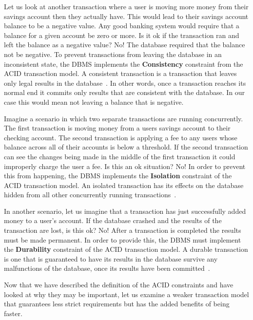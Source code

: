 \documentclass[12pt]{ucthesis}
\begin{document}
Let us look at another transaction where a user is moving more money from their savings account then they actually have. This would lead to their savings account balance to be a negative value. Any good banking system would require that a balance for a given account be zero or more. Is it ok if the transaction ran and left the balance as a negative value? No! The database required that the balance not be negative. To prevent transactions from leaving the database in an inconsistent state, the DBMS implements the \textbf{Consistency} constraint from the ACID transaction model. A consistent transaction is a transaction that leaves only legal results in the database~\cite{acid_def}. In other words, once a transaction reaches its normal end  it commits only results that are consistent with the database. In our case this would mean not leaving a balance that is negative.

Imagine a scenario in which two separate transactions are running concurrently. The first transaction is moving money from a users savings account to their checking account. The second transaction is applying a fee to any users whose balance across all of their accounts is below a threshold. If the second transaction can see the changes being made in the middle of the first transaction it could improperly charge the user a fee. Is this an ok situation? No! In order to prevent this from happening, the DBMS implements the \textbf{Isolation} constraint of the ACID transaction model. An isolated transaction has its effects on the database hidden from all other concurrently running transactions~\cite{acid_def}.

In another scenario, let us imagine that a transaction has just successfully added money to a user's account. If the database crashed and the results of the transaction are lost, is this ok? No! After a transaction is completed the results must be made permanent. In order to provide this, the DBMS must implement the \textbf{Durability} constraint of the ACID transaction model. A durable transaction is one that is guaranteed to have its results in the database survive any malfunctions of the database, once its results have been committed~\cite{acid_def}.

Now that we have described the definition of the ACID constraints and have looked at why they may be important, let us examine a weaker transaction model that guarantees less strict requirements but has the added benefits of being faster.
\end{document}
